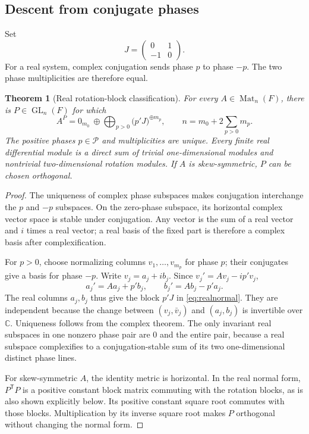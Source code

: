 \documentclass[11pt,a4paper]{article}
\numberwithin{equation}{section}
\newtheorem{theorem}{Theorem}[section]
\theoremstyle{definition}
\theoremstyle{remark}
\newcommand{\C}{\mathbb C}
\newcommand{\PP}{\mathcal P}
\newcommand{\GL}{\operatorname{GL}}
\newcommand{\Mat}{\operatorname{Mat}}
\begin{document}
\subsection{Descent from conjugate phases}
Set
\[
 J=\begin{pmatrix}0&1\\-1&0\end{pmatrix}.
\]
For a real system, complex conjugation sends phase $p$ to phase $-p$.
The two phase multiplicities are therefore equal.

\begin{theorem}[Real rotation-block classification]\label{thm:real}
For every $A\in\Mat_n(F)$, there is $P\in\GL_n(F)$ for which
\begin{equation}\label{eq:realnormal}
 A^P=0_{m_0}\ \oplus\!\bigoplus_{p>0}
          \bigl(p'J\bigr)^{\oplus m_p},
 \qquad n=m_0+2\sum_{p>0}m_p.
\end{equation}
The positive phases $p\in\PP$ and multiplicities are unique. Every finite
real differential module is a direct sum of trivial one-dimensional
modules and nontrivial two-dimensional rotation modules. If $A$ is
skew-symmetric, $P$ can be chosen orthogonal.
\end{theorem}
\begin{proof}
The uniqueness of complex phase subspaces makes conjugation interchange
the $p$ and $-p$ subspaces. On the zero-phase subspace, its horizontal
complex vector space is stable under conjugation. Any vector is the sum of
a real vector and $i$ times a real vector; a real basis of the fixed part
is therefore a complex basis after complexification.

For $p>0$, choose normalizing columns $v_1,\ldots,v_{m_p}$ for phase $p$;
their conjugates give a basis for phase $-p$. Write $v_j=a_j+ib_j$. Since
$v_j'=Av_j-ip'v_j$,
\[
 a_j'=Aa_j+p'b_j,\qquad b_j'=Ab_j-p'a_j.
\]
The real columns $a_j,b_j$ thus give the block $p'J$ in
\eqref{eq:realnormal}. They are independent because the change between
$(v_j,\bar v_j)$ and $(a_j,b_j)$ is invertible over $\C$.
Uniqueness follows from the complex theorem. The only invariant real
subspaces in one nonzero phase pair are $0$ and the entire pair, because
a real subspace complexifies to a conjugation-stable sum of its two
one-dimensional distinct phase lines.

For skew-symmetric $A$, the identity metric is horizontal. In the real
normal form, $P^{\mathsf T}P$ is a positive constant block matrix commuting
with the rotation blocks, as is also shown explicitly below. Its positive
constant square root commutes with those blocks. Multiplication by its
inverse square root makes $P$ orthogonal without changing the normal form.
\end{proof}
\end{document}
